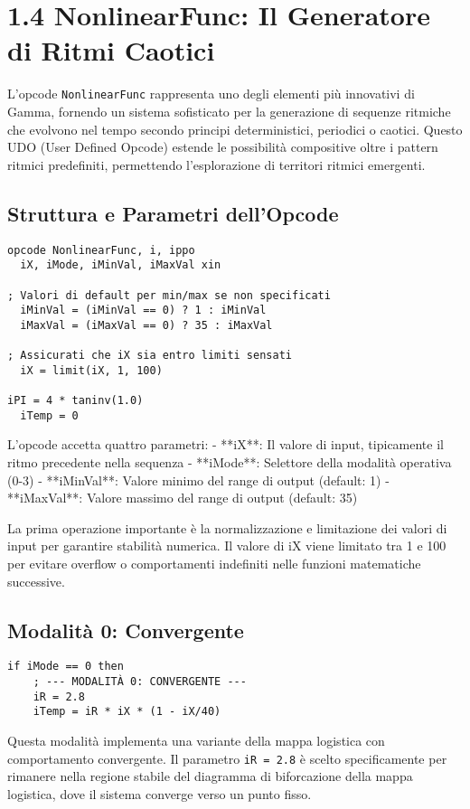\section{1.4 NonlinearFunc: Il Generatore di Ritmi Caotici}
L'opcode \texttt{NonlinearFunc} rappresenta uno degli elementi più innovativi di Gamma, fornendo un sistema sofisticato per la generazione di sequenze ritmiche che evolvono nel tempo secondo principi deterministici, periodici o caotici. Questo UDO (User Defined Opcode) estende le possibilità compositive oltre i pattern ritmici predefiniti, permettendo l'esplorazione di territori ritmici emergenti.
\subsection{Struttura e Parametri dell'Opcode}
\begin{lstlisting}[language=Csound]
opcode NonlinearFunc, i, ippo
  iX, iMode, iMinVal, iMaxVal xin

; Valori di default per min/max se non specificati
  iMinVal = (iMinVal == 0) ? 1 : iMinVal
  iMaxVal = (iMaxVal == 0) ? 35 : iMaxVal

; Assicurati che iX sia entro limiti sensati
  iX = limit(iX, 1, 100)

iPI = 4 * taninv(1.0)  
  iTemp = 0
\end{lstlisting}

L'opcode accetta quattro parametri:
- **iX**: Il valore di input, tipicamente il ritmo precedente nella sequenza
- **iMode**: Selettore della modalità operativa (0-3)
- **iMinVal**: Valore minimo del range di output (default: 1)
- **iMaxVal**: Valore massimo del range di output (default: 35)

La prima operazione importante è la normalizzazione e limitazione dei valori di input per garantire stabilità numerica. Il valore di iX viene limitato tra 1 e 100 per evitare overflow o comportamenti indefiniti nelle funzioni matematiche successive.
\subsection{Modalità 0: Convergente}
\begin{lstlisting}[language=Csound]
if iMode == 0 then
    ; --- MODALITÀ 0: CONVERGENTE ---
    iR = 2.8
    iTemp = iR * iX * (1 - iX/40)
\end{lstlisting}

Questa modalità implementa una variante della mappa logistica con comportamento convergente. Il parametro \texttt{iR = 2.8} è scelto specificamente per rimanere nella regione stabile del diagramma di biforcazione della mappa logistica, dove il sistema converge verso un punto fisso.

